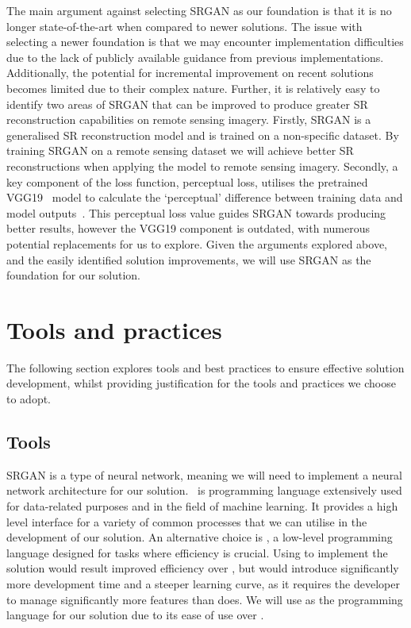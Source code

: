 The main argument against selecting SRGAN as our foundation is that it is no longer state-of-the-art when compared to newer solutions. The issue with selecting a newer foundation is that we may encounter implementation difficulties due to the lack of publicly available guidance from previous implementations. Additionally, the potential for incremental improvement on recent solutions becomes limited due to their complex nature. Further, it is relatively easy to identify two areas of SRGAN that can be improved to produce greater SR reconstruction capabilities on remote sensing imagery. Firstly, SRGAN is a generalised SR reconstruction model and is trained on a non-specific dataset. By training SRGAN on a remote sensing dataset we will achieve better SR reconstructions when applying the model to remote sensing imagery. Secondly, a key component of the loss function, perceptual loss, utilises the pretrained VGG19~\cite{vgg19} model to calculate the `perceptual' difference between training data and model outputs~\cite{srgan}. This perceptual loss value guides SRGAN towards producing better results, however the VGG19 component is outdated, with numerous potential replacements for us to explore. Given the arguments explored above, and the easily identified solution improvements, we will use SRGAN as the foundation for our solution.

\section{Tools and practices}
The following section explores tools and best practices to ensure effective solution development, whilst providing justification for the tools and practices we choose to adopt.

\subsection{Tools}
SRGAN is a type of neural network, meaning we will need to implement a neural network architecture for our solution.\  is programming language extensively used for data-related purposes and in the field of machine learning. It provides a high level interface for a variety of common processes that we can utilise in the development of our solution. An alternative choice is , a low-level programming language designed for tasks where efficiency is crucial. Using  to implement the solution would result improved efficiency over , but would introduce significantly more development time and a steeper learning curve, as it requires the developer to manage significantly more features than  does. We will use  as the programming language for our solution due to its ease of use over .

